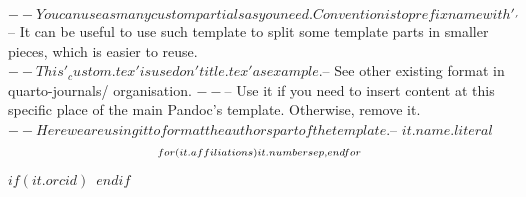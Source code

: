 $-- You can use as many custom partials as you need. Convention is to prefix name with '_'
$-- It can be useful to use such template to split some template parts in smaller pieces, which is easier to reuse. 
$-- This '_custom.tex' is used on 'title.tex' as example.
$-- See other existing format in quarto-journals/ organisation.
$-- %
$-- Use it if you need to insert content at this specific place of the main Pandoc's template. Otherwise, remove it.
$-- Here we are using it to format the authors part of the template.
$-- %
$it.name.literal$$$\textsuperscript{$for(it.affiliations)$$it.number$$sep$,$endfor$}$$$if(it.orcid)$~$endif$
